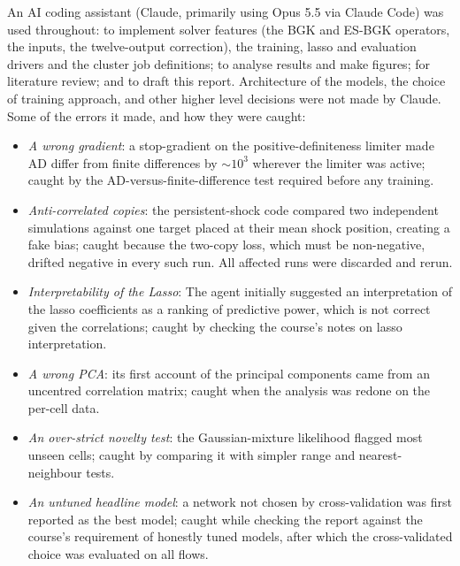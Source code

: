 \documentclass[10pt]{article}
\begin{document}
An AI coding assistant (Claude, primarily using Opus 5.5 via Claude Code) was used throughout: to implement solver features (the BGK and
ES-BGK operators, the inputs, the twelve-output correction), the training, lasso and evaluation
drivers and the cluster job definitions; to analyse results and make figures; for literature review; and to draft this
report. Architecture of the models, the choice of training approach, and other higher level decisions were not made by Claude. Some of the errors it made, and how they were caught:
\begin{itemize}
\item \emph{A wrong gradient}: a stop-gradient on the positive-definiteness limiter made AD
differ from finite differences by $\sim10^3$ wherever the limiter was active; caught by the
AD-versus-finite-difference test required before any training.
\item \emph{Anti-correlated copies}: the persistent-shock code compared two independent
simulations against one target placed at their mean shock position, creating a fake bias;
caught because the two-copy loss, which must be non-negative, drifted negative in every such
run. All affected runs were discarded and rerun.
\item \emph{Interpretability of the Lasso}: The agent initially suggested an interpretation of the lasso coefficients as a ranking of 
predictive power, which is not correct given the correlations; caught by checking the course's notes on lasso interpretation.
\item \emph{A wrong PCA}: its first account of the principal components came from an uncentred
correlation matrix; caught when the analysis was redone on the per-cell data.
\item \emph{An over-strict novelty test}: the Gaussian-mixture likelihood flagged most unseen
cells; caught by comparing it with simpler range and nearest-neighbour tests.
\item \emph{An untuned headline model}: a network not chosen by cross-validation was first
reported as the best model; caught while checking the report against the course's requirement of honestly tuned models, after which
the cross-validated choice was evaluated on all flows.
\end{itemize}
\end{document}
